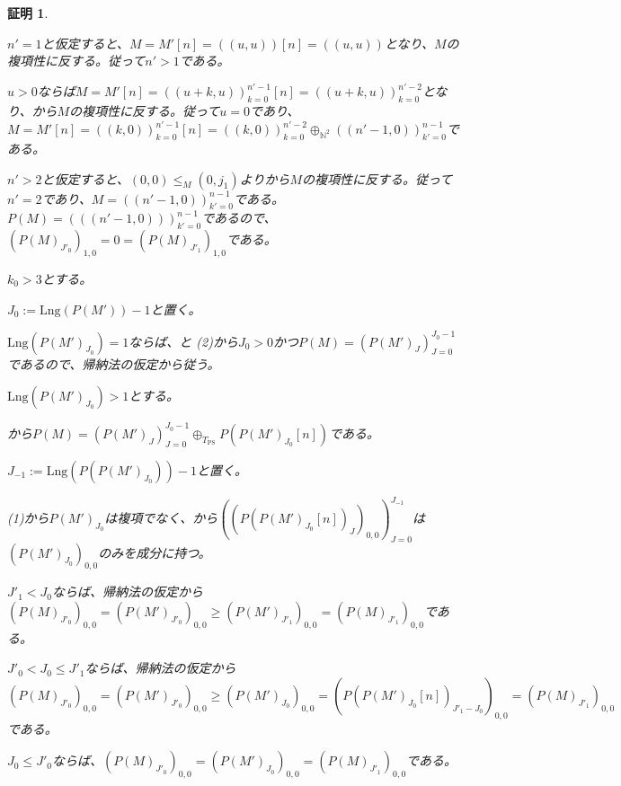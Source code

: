 \documentclass[dvipdfmx,uplatex]{jsarticle}
\theoremstyle{customnonumberbreakfortheorem}
\theoremstyle{customnonumberbreakforproof}
\newtheorem{hideableproof}{証明}
\begin{document}
\begin{hideableproof}
\begin{indented}
\begin{indented}
			\item \(n' = 1\)と仮定すると、\(M = M'[n] = ((u,u))[n] = ((u,u))\)となり、\(M\)の複項性に反する。従って\(n' > 1\)である。
			\item \(u > 0\)ならば\(M = M'[n] = ((u+k,u))_{k=0}^{n'-1}[n] = ((u+k,u))_{k=0}^{n'-2}\)となり、から\(M\)の複項性に反する。従って\(u = 0\)であり、\(M = M'[n] = ((k,0))_{k=0}^{n'-1}[n] = ((k,0))_{k=0}^{n'-2} \oplus_{\mathbb{N}^2} ((n'-1,0))_{k'=0}^{n-1}\)である。
			\item \(n' > 2\)と仮定すると、\((0,0) \leq_M (0,j_1)\)よりから\(M\)の複項性に反する。従って\(n' = 2\)であり、\(M = ((n'-1,0))_{k'=0}^{n-1}\)である。\(P(M) = (((n'-1,0)))_{k'=0}^{n-1}\)であるので、\((P(M)_{J'_0})_{1,0} = 0 = (P(M)_{J'_1})_{1,0}\)である。
		\end{indented}
		\item \(k_0 > 3\)とする。
		\begin{indented}
			\item \(J_0 := \textrm{Lng}(P(M'))-1\)と置く。
			\item \(\textrm{Lng}(P(M')_{J_0}) = 1\)ならば、と (2)から\(J_0 > 0\)かつ\(P(M) = (P(M')_J)_{J=0}^{J_0-1}\)であるので、帰納法の仮定から従う。
			\item \(\textrm{Lng}(P(M')_{J_0}) > 1\)とする。
			\begin{indented}
				\item {}から\(P(M) = (P(M')_J)_{J=0}^{J_0-1} \oplus_{T_{\textrm{PS}}} P(P(M')_{J_0}[n])\)である。
				\item \(J_{-1} := \textrm{Lng}(P(P(M')_{J_0}))-1\)と置く。
				\item {} (1)から\(P(M')_{J_0}\)は複項でなく、から\(((P(P(M')_{J_0}[n])_J)_{0,0})_{J=0}^{J_{-1}}\)は\((P(M')_{J_0})_{0,0}\)のみを成分に持つ。
				\item \(J'_1 < J_0\)ならば、帰納法の仮定から\((P(M)_{J'_0})_{0,0} = (P(M')_{J'_0})_{0,0} \geq (P(M')_{J'_1})_{0,0} = (P(M)_{J'_1})_{0,0}\)である。
				\item \(J'_0 < J_0 \leq J'_1\)ならば、帰納法の仮定から\((P(M)_{J'_0})_{0,0} = (P(M')_{J'_0})_{0,0} \geq (P(M')_{J_0})_{0,0} = (P(P(M')_{J_0}[n])_{J'_1-J_0})_{0,0} = (P(M)_{J'_1})_{0,0}\)である。
				\item \(J_0 \leq J'_0\)ならば、\((P(M)_{J'_0})_{0,0} = (P(M')_{J_0})_{0,0} = (P(M)_{J'_1})_{0,0}\)である。
			\end{indented}
		\end{indented}
	\end{indented}
\end{hideableproof}
\end{document}
